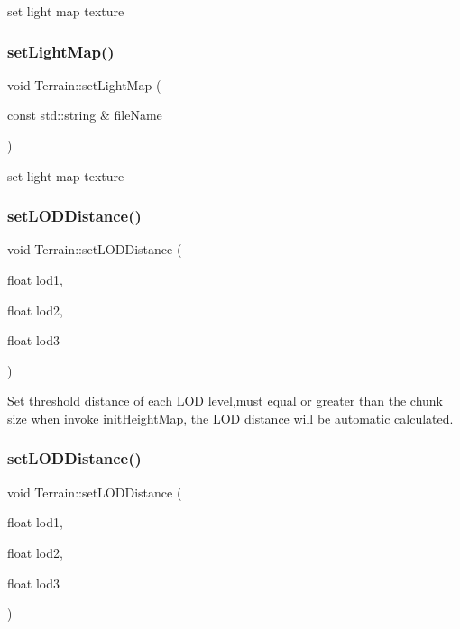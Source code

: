 set light map texture \mbox{\label{classTerrain_a296f207c5fae616a75099156ef8cd0ac}} 
\subsubsection{\texorpdfstring{set\+Light\+Map()}{setLightMap()}\hspace{0.1cm}{\footnotesize\ttfamily [2/2]}}
{\footnotesize\ttfamily void Terrain\+::set\+Light\+Map (\begin{DoxyParamCaption}\item[{const std\+::string \&}]{file\+Name }\end{DoxyParamCaption})}

set light map texture \mbox{\label{classTerrain_acffb1ca57d78d5aa643281d34bf0bf1b}} 
\subsubsection{\texorpdfstring{set\+L\+O\+D\+Distance()}{setLODDistance()}\hspace{0.1cm}{\footnotesize\ttfamily [1/2]}}
{\footnotesize\ttfamily void Terrain\+::set\+L\+O\+D\+Distance (\begin{DoxyParamCaption}\item[{float}]{lod1,  }\item[{float}]{lod2,  }\item[{float}]{lod3 }\end{DoxyParamCaption})}

Set threshold distance of each L\+OD level,must equal or greater than the chunk size  when invoke init\+Height\+Map, the L\+OD distance will be automatic calculated. \mbox{\label{classTerrain_acffb1ca57d78d5aa643281d34bf0bf1b}} 
\subsubsection{\texorpdfstring{set\+L\+O\+D\+Distance()}{setLODDistance()}\hspace{0.1cm}{\footnotesize\ttfamily [2/2]}}
{\footnotesize\ttfamily void Terrain\+::set\+L\+O\+D\+Distance (\begin{DoxyParamCaption}\item[{float}]{lod1,  }\item[{float}]{lod2,  }\item[{float}]{lod3 }\end{DoxyParamCaption})}

